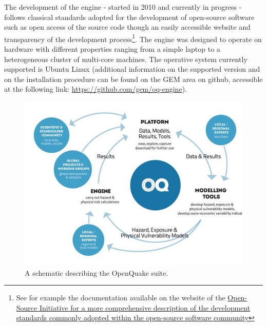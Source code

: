 The development of the engine - started in 2010 and currently in 
progress - follows classical standards adopted for the development 
of open-source software such as open access of the source code though an easily
accessible website and transparency of the development process\footnote{See for 
example the documentation available on the website 
of the \href{http://opensource.org/osr}{Open-Source Initiative for a 
more comprehensive description of the development standards commonly 
adopted within the open-source software community}}.
The engine was designed to operate on hardware with different properties
ranging from a simple laptop to a heterogeneous cluster of multi-core machines.
The operative system currently supported is Ubuntu Linux (additional
information on the supported version and on the installation procedure can 
be found on the GEM area on github, accessible at the following link:
\href{https://github.com/gem/oq-engine}{https://github.com/gem/oq-engine}). 
\begin{figure}[!ht]
\centering
\includegraphics[width=14cm]{./Pictures/intro/OQ-workflows.jpg}
\caption{A schematic describing the OpenQuake suite.}
\label{fig:oq_platform}
\end{figure}
%
